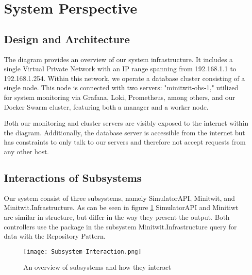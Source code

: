\section{System Perspective}

\subsection{Design and Architecture}
The diagram provides an overview of our system infrastructure. It includes a single Virtual Private Network with an IP range spanning from 192.168.1.1 to 192.168.1.254. Within this network, we operate a database cluster consisting of a single node. This node is connected with two servers: "minitwit-obs-1," utilized for system monitoring via Grafana, Loki, Prometheus, among others, and our Docker Swarm cluster, featuring both a manager and a worker node.

Both our monitoring and cluster servers are visibly exposed to the internet within the diagram. Additionally, the database server is accessible from the internet but has constraints to only talk to our servers and therefore not accept requests from any other host.

\subsection{Interactions of Subsystems}
Our system consist of three subsystems, namely SimulatorAPI, Minitwit, and Minitwit.Infrastructure. As can be seen in figure \ref{fig:subsystem-interaction} SimulatorAPI and Minitiwt are similar in structure, but differ in the way they present the output. Both controllers use the package in the subsystem Minitwit.Infrastructure query for data with the Repository Pattern.

\begin{figure}[H]
    \begin{center}
        \texttt{[image: Subsystem-Interaction.png]}
    \end{center}
    \caption{An overview of subsystems and how they interact}
    \label{fig:subsystem-interaction}
\end{figure}

